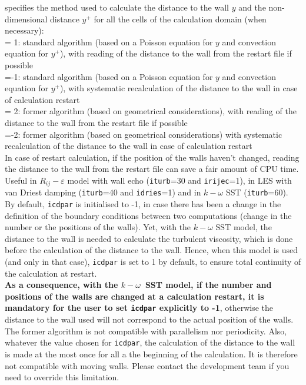 {specifies the method used to calculate the distance to the wall $y$ and the
non-dimensional distance $y^+$ for all the
cells of the calculation domain (when necessary):\\
\hspace*{1.3cm}= 1: standard algorithm (based on a Poisson equation for $y$ and
convection equation for $y^+$),
with reading of the distance to the wall from the restart file
if possible\\
\hspace*{1.3cm}=-1: standard algorithm (based on a Poisson equation for $y$ and
convection equation for $y^+$),
with systematic recalculation of the distance to the wall in case of
calculation restart\\
\hspace*{1.3cm}= 2: former algorithm (based on geometrical
considerations),
with reading of the distance to the wall from the restart file
if possible\\
\hspace*{1.3cm}=-2: former algorithm (based on geometrical
considerations) with systematic recalculation of the distance to the
wall in case of calculation restart\\
In case of restart calculation, if the position of the walls haven't changed,
reading the distance to the wall from the restart file can save a fair amount of
CPU time.\\
Useful in $R_{ij}-\varepsilon$ model with wall echo ({\tt iturb}=30 and
{\tt irijec}=1), in LES with van Driest damping ({\tt iturb}=40 and
{\tt idries}=1) and in $k-\omega$ SST ({\tt iturb}=60). \\
By default, {\tt icdpar} is initialised to -1, in case there has been a change in the
definition of the boundary conditions between two computations (change in the
number or the positions of the walls). Yet, with the $k-\omega$ SST model, the
distance to the wall is needed to calculate the turbulent viscosity, which is
done before the calculation of the distance to the wall. Hence, when this model
is used (and only in that case), {\tt icdpar} is set to 1 by default, to ensure total
continuity of the calculation at restart.\\
{\bf As a consequence, with the \boldmath$k-\omega$\unboldmath\ SST model, if
the number and positions of the walls are changed at a calculation restart, it
is mandatory for the user to set {\tt icdpar} explicitly to -1}, otherwise the
distance to the wall used will not correspond to the actual position of the
walls.\\
The former algorithm is not compatible with parallelism nor periodicity. Also,
whatever the value chosen for {\tt icdpar}, the calculation of the distance to the
wall is made at the most once for all a the beginning of the calculation. It is
therefore not compatible with moving walls. Please contact the development team
if you need to override this limitation.}


